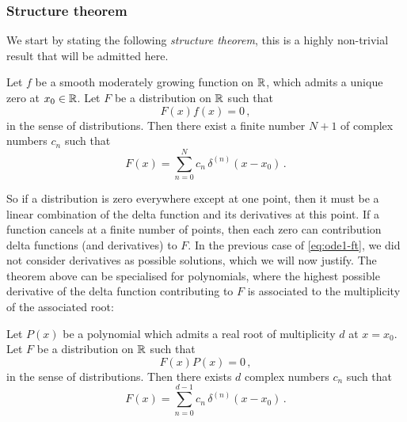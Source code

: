 \subsubsection{Structure theorem}
We start by stating the following \emph{structure theorem}, this is a highly non-trivial
result that will be admitted here.
\begin{theorem}
  \label{thm:structure}
  Let $f$ be a smooth moderately growing function on $\mathbb{R}$, which admits a unique zero at
  $x_0\in\mathbb{R}$. Let $F$ be a distribution on $\mathbb{R}$ such that
  \begin{equation}
    F(x)f(x)=0\,,
  \end{equation}
  in the sense of distributions. Then there exist a finite number $N+1$ of complex numbers
  $c_n$ such that
  \begin{equation}
    F(x)=\sum_{n=0}^{N}c_n\,\delta^{(n)}(x-x_0)\,.
  \end{equation}
\end{theorem}
So if a distribution is zero everywhere except at one point, then it must be a linear
combination of the delta function and its derivatives at this point. If a function cancels
at a finite number of points, then each zero can contribution delta functions (and
derivatives) to $F$. In the previous case of \cref{eq:ode1-ft}, we did not consider
derivatives as possible solutions, which we will now justify. The theorem above can be
specialised for polynomials, where the highest possible derivative of the delta function
contributing to $F$ is associated to the multiplicity of the associated root:
\begin{theorem}
  \label{thm:structure-poly}
  Let $P(x)$ be a polynomial which admits a real root of multiplicity $d$ at $x=x_0$. Let
  $F$ be a distribution on $\mathbb{R}$ such that
  \begin{equation}
    F(x)P(x)=0\,,
    \label{eq:prodzero-poly}
  \end{equation}
  in the sense of distributions. Then there exists $d$ complex numbers $c_n$ such that
  \begin{equation}
    F(x)=\sum_{n=0}^{d-1}c_n\,\delta^{(n)}(x-x_0)\,.
  \end{equation}
\end{theorem}
